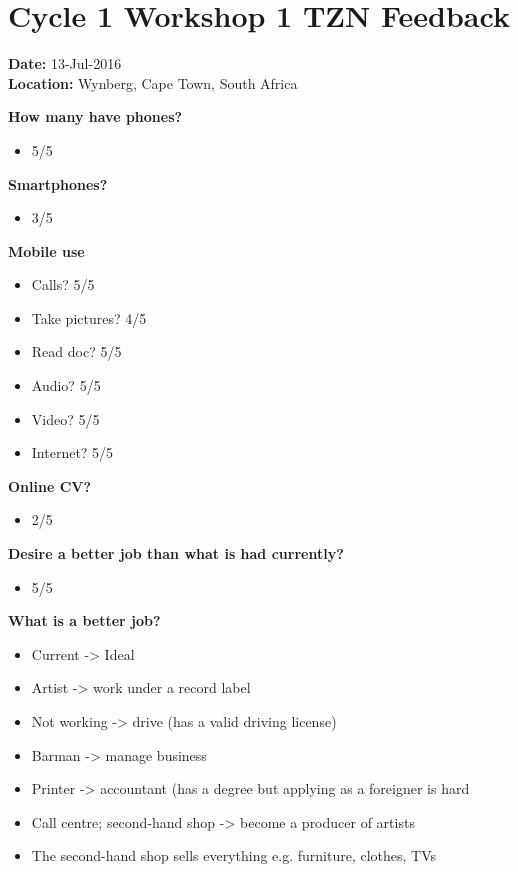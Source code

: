 \section{Cycle 1 Workshop 1 TZN Feedback}

\noindent\textbf{Date:} 13-Jul-2016 \\
\noindent\textbf{Location:} Wynberg, Cape Town, South Africa



\noindent\textbf{How many have phones?}
\begin{itemize}
\item 5/5
\end{itemize}

\noindent\textbf{Smartphones?}
\begin{itemize}
\item 3/5
\end{itemize}

\noindent\textbf{Mobile use}
\begin{itemize}
\item Calls? 5/5
\item Take pictures? 4/5
\item Read doc? 5/5
\item Audio? 5/5
\item Video? 5/5
\item Internet? 5/5
\end{itemize}

\noindent\textbf{Online CV?}
\begin{itemize}
\item 2/5
\end{itemize}

\noindent\textbf{Desire a better job than what is had currently?}
\begin{itemize}
\item 5/5
\end{itemize}

\noindent\textbf{What is a better job?}
\begin{itemize}
\item Current -> Ideal
\item Artist -> work under a record label
\item Not working -> drive (has a valid driving license)
\item Barman -> manage business
\item Printer -> accountant (has a degree but applying as a foreigner is hard
\item Call centre; second-hand shop -> become a producer of artists
\item The second-hand shop sells everything e.g. furniture, clothes, TVs
\end{itemize}


